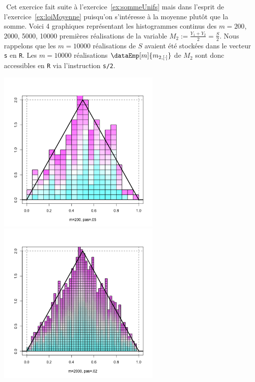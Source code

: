 \documentclass[10pt]{report}
\begin{document}
\begin{exercice} ${ }$\label{ex:histMoyUnifs}
Cet exercice fait suite à l'exercice~\ref{ex:sommeUnifs} mais dans l'esprit de l'exercice~\ref{ex:loiMoyenne} puisqu'on s'intéresse à la moyenne plutôt que la somme. Voici 4 graphiques représentant les histogrammes continus des $m=200$, 2000, 5000, 10000 premières réalisations de la variable $M_2:=\frac{Y_1+Y_2}2=\frac{S}2$. Nous rappelons que les $m=10000$ réalisations de $S$ avaient été stockées dans le vecteur \texttt{s} en \texttt{R}. Les $m=10000$ réalisations $\dataEmp[m]{m_{2,[\cdot]}}$ de $M_2$ sont donc accessibles en \texttt{R} via l'instruction \texttt{s/2}. 







\centerline{\includegraphics[width=8cm,height=8cm]{img/deuxUnif200} \includegraphics[width=8cm,height=8cm]{img/deuxUnif2000}}

\end{exercice}
\end{document}
